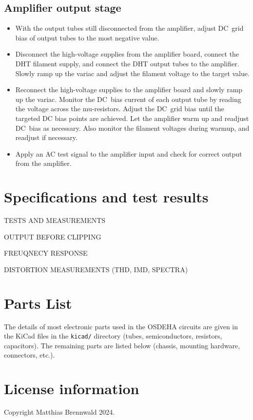 \subsection{Amplifier output stage}
\begin{itemize}
\item With the output tubes still disconnected from the amplifier, adjust DC grid bias of output tubes to the most negative value.
\item Disconnect the high-voltage supplies from the amplifier board, connect the DHT filament supply, and connect the DHT output tubes to the amplifier. Slowly ramp up the variac and adjust the filament voltage to the target value.
\item Reconnect the high-voltage supplies to the amplifier board and slowly ramp up the variac. Monitor the DC bias current of each output tube by reading the voltage across the mu-resistors. Adjust the DC grid bias until the targeted DC bias points are achieved. Let the amplifier warm up and readjust DC bias as necessary. Also monitor the filament voltages during warmup, and readjust if necessary.
\item Apply an AC test signal to the amplifier input and check for correct output from the amplifier.
\end{itemize}



\section{Specifications and test results}

TESTS AND MEASUREMENTS

OUTPUT BEFORE CLIPPING

FREUQNECY RESPONSE

DISTORTION MEASUREMENTS (THD, IMD, SPECTRA)


\section{Parts List}

The details of most electronic parts used in the OSDEHA circuits are given in the KiCad files in the {\tt kicad/} directory (tubes, semiconductors, resistors, capacitors). The remaining parts are listed below (chassis, mounting hardware, connectors, etc.).

{\footnotesize {}}

\clearpage
\section{License information} 
Copyright Matthias Brennwald 2024.                                                    

